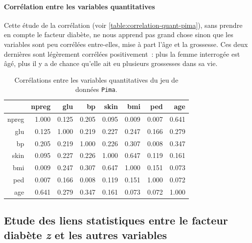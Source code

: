 \documentclass[a4paper,10pt]{report}
\begin{document}
\paragraph{Corrélation entre les variables quantitatives}

Cette étude de la corrélation (voir \autoref{table:correlation-quant-pima}), sans prendre en compte le facteur diabète, ne nous apprend pas grand chose sinon que les variables sont peu corrélées entre-elles, mise à part l'âge et la grossesse. Ces deux dernières sont légèrement corrélées positivement~: plus la femme interrogée est âgé, plus il y a de chance qu'elle ait eu plusieurs grossesses dans sa vie.


\begin{table}[H]
	\centering
	\captionsetup{justification=centering, margin=4cm}
	\caption{Corrélations entre les variables quantitatives du jeu de données \texttt{Pima}.}
	\begin{tabular}{r|rrrrrrr}
		& npreg & glu & bp & skin & bmi & ped & age \\ 
		\hline
		npreg & 1.000 & 0.125 & 0.205 & 0.095 & 0.009 & 0.007 & 0.641 \\ 
		glu & 0.125 & 1.000 & 0.219 & 0.227 & 0.247 & 0.166 & 0.279 \\ 
		bp & 0.205 & 0.219 & 1.000 & 0.226 & 0.307 & 0.008 & 0.347 \\ 
		skin & 0.095 & 0.227 & 0.226 & 1.000 & 0.647 & 0.119 & 0.161 \\ 
		bmi & 0.009 & 0.247 & 0.307 & 0.647 & 1.000 & 0.151 & 0.073 \\ 
		ped & 0.007 & 0.166 & 0.008 & 0.119 & 0.151 & 1.000 & 0.072 \\ 
		age & 0.641 & 0.279 & 0.347 & 0.161 & 0.073 & 0.072 & 1.000 \\ 
	\end{tabular}
	\label{table:correlation-quant-pima}
\end{table}


\subsection{Etude des liens statistiques entre le facteur diabète \textit{z} et les autres variables}
\end{document}
